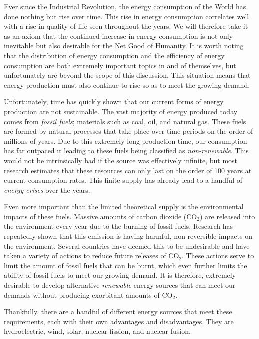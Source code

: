 	Ever since the Industrial Revolution, the energy consumption of the World has done nothing but rise over time. \cite{owidenergy} This rise in energy consumption correlates well with a rise in quality of life seen throughout the years. \cite{owidQoL} We will therefore take it as an axiom that the continued increase in energy consumption is not only inevitable but also desirable for the Net Good of Humanity. It is worth noting that the distribution of energy consumption and the efficiency of energy consumption are both extremely important topics in and of themselves, but unfortunately are beyond the scope of this discussion. This situation means that energy production must also continue to rise so as to meet the growing demand.
	
	Unfortunately, time has quickly shown that our current forms of energy production are not sustainable. \cite{owidfossilfuels} The vast majority of energy produced today comes from \emph{fossil fuels}; materials such as coal, oil, and natural gas. \cite{owidenergy} These fuels are formed by natural processes that take place over time periods on the order of millions of years. \cite{sato1990thermochemistry} Due to this extremely long production time, our consumption has far outpaced it leading to these fuels being classified as \emph{non-renewable}. This would not be intrinsically bad if the source was effectively infinite, but most research estimates that these resources can only last on the order of 100 years at current consumption rates. \cite{owidfossilfuels} This finite supply has already lead to a handful of \emph{energy crises} over the years. \cite{bibid}
	
	Even more important than the limited theoretical supply is the environmental impacts of these fuels. Massive amounts of carbon dioxide (CO$_2$) are released into the environment every year due to the burning of fossil fuels. \cite{bibid} Research has repeatedly shown that this emission is having harmful, non-reversible impacts on the environment. \cite{bibid} Several countries have deemed this to be undesirable and have taken a variety of actions to reduce future releases of CO$_2$. \cite{bibid} These actions serve to limit the amount of fossil fuels that can be burnt, which even further limits the ability of fossil fuels to meet our growing demand. It is therefore, extremely desirable to develop alternative \emph{renewable} energy sources that can meet our demands without producing exorbitant amounts of CO$_2$.
	
	Thankfully, there are a handful of different energy sources that meet these requirements, each with their own advantages and disadvantages. They are hydroelectric, wind, solar, nuclear fission, and nuclear fusion. 
	
